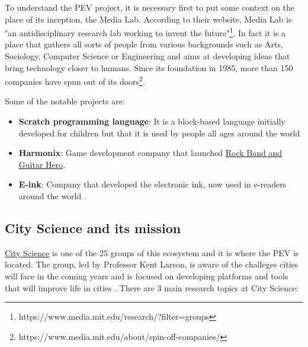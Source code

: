 To understand the PEV project, it is necessary first to put some context on the place of its inception, the Media Lab. According to their website, Media Lab is "an antidisciplinary research lab working to invent the future"\footnote{https://www.media.mit.edu/research/?filter=groups}. In fact it is a place that gathers all sorts of people from various backgrounds such as Arts, Sociology, Computer Science or Engineering and aims at developing ideas that bring technology closer to humans. Since its foundation in 1985, more than 150 companies have spun out of its doors\footnote{https://www.media.mit.edu/about/spin-off-companies/}.

Some of the notable projects are:

\begin{itemize}
  \item \textbf{Scratch programming language}: It is a block-based language initially developed for children but that it is used by people all ages around the world 

  \item \textbf{Harmonix}: Game development company that launched \href{http://www.harmonixmusic.com/}{Rock Band and Guitar Hero}.

  \item \textbf{E-ink}: Company that developed the electronic ink, now used in e-readers around the world .
\end{itemize}

\subsection{City Science and its mission}

\href{https://www.media.mit.edu/groups/city-science/overview/}{City Science} is one of the 25 groups of this ecosystem and it is where the PEV is located. The group, led by Professor Kent Larson, is aware of the challeges cities will face in the coming years and is focused on developing platforms and tools that will improve life in cities . There are 3 main research topics at City Science:

